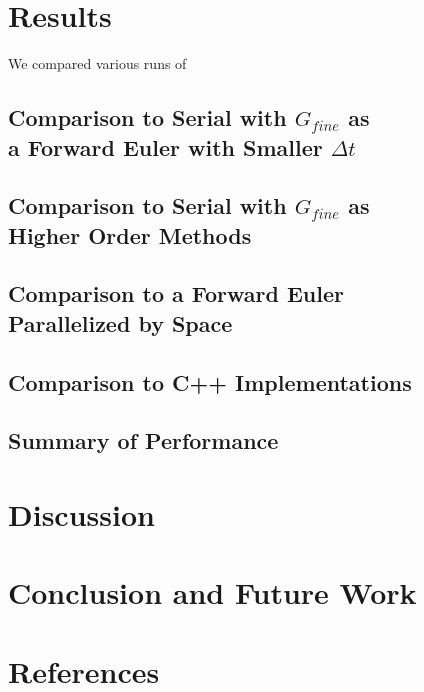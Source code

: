 \documentclass[letterpaper,twocolumn,11pt]{article}
\begin{document}
\section{Results}
We compared various runs of 

\subsection{Comparison to Serial with $G_{fine}$ as \\a Forward Euler with Smaller $\Delta t$}

\subsection{Comparison to Serial with $G_{fine}$ as \\Higher Order Methods}

\subsection{Comparison to a Forward Euler \\Parallelized by Space}

\subsection{Comparison to C++ Implementations}

\subsection{Summary of Performance}

\section{Discussion}

\section{Conclusion and Future Work}

\section{References}
\end{document}
